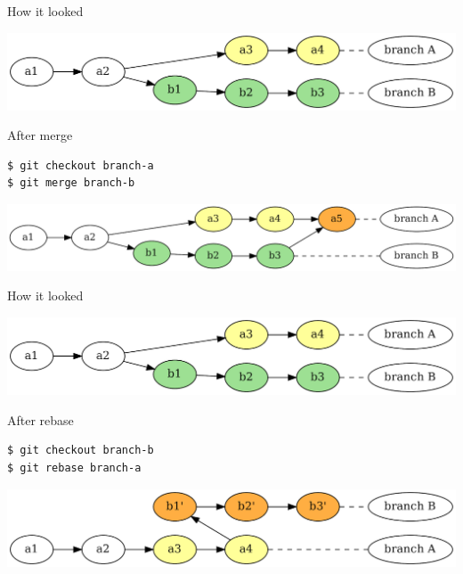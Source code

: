 \documentclass[presentation,aspectratio=169,smaller]{beamer}
\begin{document}
\begin{frame}[label={sec:org8d5da12}]{How it looked}
\begin{center}
\includegraphics[width=.9\linewidth]{images/merging-vs-rebasing-0.png}
\end{center}
\end{frame}

\begin{frame}[label={sec:org19ef3f4},fragile]{After merge}
 \begin{verbatim}
$ git checkout branch-a
$ git merge branch-b
\end{verbatim}

\begin{center}
\includegraphics[width=.9\linewidth]{images/merging-vs-rebasing-1.png}
\end{center}
\end{frame}

\begin{frame}[label={sec:orgd4b46cb}]{How it looked}
\begin{center}
\includegraphics[width=.9\linewidth]{images/merging-vs-rebasing-0.png}
\end{center}
\end{frame}


\begin{frame}[label={sec:org040223a},fragile]{After rebase}
 \begin{verbatim}
$ git checkout branch-b
$ git rebase branch-a
\end{verbatim}

\begin{center}
\includegraphics[width=.9\linewidth]{images/merging-vs-rebasing-2.png}
\end{center}
\end{frame}
\end{document}
